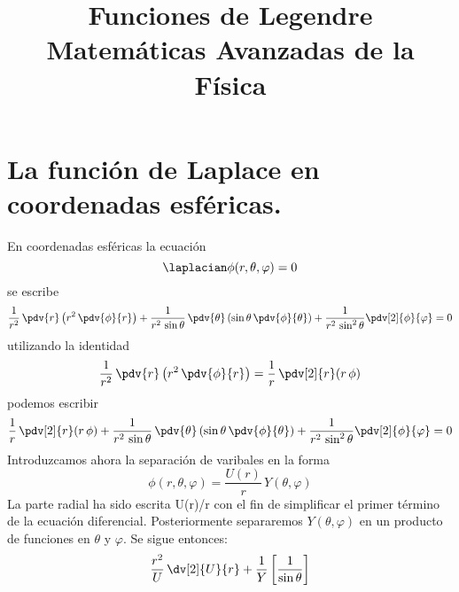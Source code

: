 

\title{Funciones de Legendre \\ {\large Matemáticas Avanzadas de la Física}}
\date{ }

\maketitle
\fontsize{14}{14}\selectfont
\section{La función de Laplace en coordenadas esféricas.}
En coordenadas esféricas la ecuación
\[ \laplacian \phi (r, \theta, \varphi) = 0 \]
se escribe
\[ \dfrac{1}{r^{2}} \, \pdv{r} \left( r^{2} \, \pdv{\phi}{r} \right) + \dfrac{1}{r^{2} \, \sin \theta} \, \pdv{\theta} \left( \sin \theta \, \pdv{\phi}{\theta} \right) + \dfrac{1}{r^{2} \, \sin^{2} \theta} \pdv[2]{\phi}{\varphi} = 0 \]
utilizando la identidad
\[ \dfrac{1}{r^{2}} \, \pdv{r} \left( r^{2} \, \pdv{\phi}{r} \right) = \dfrac{1}{r} \, \pdv[2]{r} (r \, \phi) \]
podemos escribir
\[ \dfrac{1}{r} \, \pdv[2]{r} (r \, \phi) + \dfrac{1}{r^{2} \, \sin \theta} \, \pdv{\theta} \left( \sin \theta \, \pdv{\phi}{\theta} \right) + \dfrac{1}{r^{2} \, \sin^{2} \theta} \pdv[2]{\phi}{\varphi} = 0 \]
Introduzcamos ahora la separación de varibales en la forma
\[ \phi (r, \theta, \varphi) =  \dfrac{U(r)}{r} \, Y(\theta, \varphi) \]
La parte radial ha sido escrita U(r)/r con el fin de simplificar el primer término de la ecuación diferencial. Posteriormente separaremos $Y(\theta, \varphi)$ en un producto de funciones en $\theta$ y $\varphi$. Se sigue entonces:
\[ \dfrac{r^{2}}{U} \, \dv[2]{U}{r} + \dfrac{1}{Y} \left[ \dfrac{1}{\sin \theta} \right] \]
